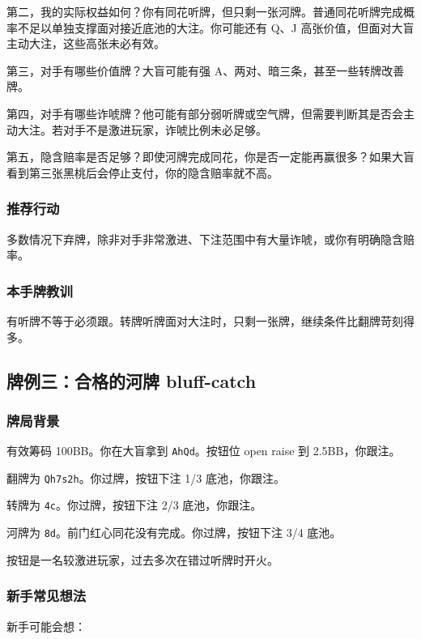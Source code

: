 第二，我的实际权益如何？你有同花听牌，但只剩一张河牌。普通同花听牌完成概率不足以单独支撑面对接近底池的大注。你可能还有 Q、J 高张价值，但面对大盲主动大注，这些高张未必有效。

第三，对手有哪些价值牌？大盲可能有强 A、两对、暗三条，甚至一些转牌改善牌。

第四，对手有哪些诈唬牌？他可能有部分弱听牌或空气牌，但需要判断其是否会主动大注。若对手不是激进玩家，诈唬比例未必足够。

第五，隐含赔率是否足够？即使河牌完成同花，你是否一定能再赢很多？如果大盲看到第三张黑桃后会停止支付，你的隐含赔率就不高。

\subsubsection*{推荐行动}

多数情况下弃牌，除非对手非常激进、下注范围中有大量诈唬，或你有明确隐含赔率。

\subsubsection*{本手牌教训}

有听牌不等于必须跟。转牌听牌面对大注时，只剩一张牌，继续条件比翻牌苛刻得多。

\subsection{牌例三：合格的河牌 bluff-catch}

\subsubsection*{牌局背景}

有效筹码 100BB。你在大盲拿到 \texttt{AhQd}。按钮位 open raise 到 2.5BB，你跟注。

翻牌为 \texttt{Qh7s2h}。你过牌，按钮下注 1/3 底池，你跟注。

转牌为 \texttt{4c}。你过牌，按钮下注 2/3 底池，你跟注。

河牌为 \texttt{8d}。前门红心同花没有完成。你过牌，按钮下注 3/4 底池。

按钮是一名较激进玩家，过去多次在错过听牌时开火。

\subsubsection*{新手常见想法}

新手可能会想：

